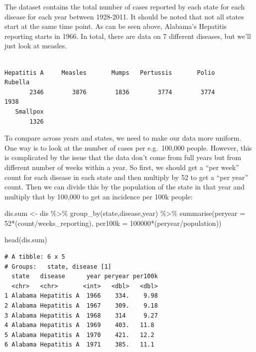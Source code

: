 \documentclass[
  letterpaper,
  DIV=11,
  numbers=noendperiod]{scrreprt}
\newenvironment{Shaded}{\begin{snugshade}}{\end{snugshade}}
\newcommand{\AttributeTok}[1]{\textcolor[rgb]{0.40,0.45,0.13}{#1}}
\newcommand{\DecValTok}[1]{\textcolor[rgb]{0.68,0.00,0.00}{#1}}
\newcommand{\FunctionTok}[1]{\textcolor[rgb]{0.28,0.35,0.67}{#1}}
\newcommand{\NormalTok}[1]{\textcolor[rgb]{0.00,0.23,0.31}{#1}}
\newcommand{\OtherTok}[1]{\textcolor[rgb]{0.00,0.23,0.31}{#1}}
\newcommand{\SpecialCharTok}[1]{\textcolor[rgb]{0.37,0.37,0.37}{#1}}
\begin{document}
The dataset contains the total number of cases reported by each state
for each disease for each year between 1928-2011. It should be noted
that not all states start at the same time point. As can be seen above,
Alabama's Hepatitis reporting starts in 1966. In total, there are data
on 7 different diseases, but we'll just look at measles.

\begin{Shaded}
\end{Shaded}

\begin{verbatim}

Hepatitis A     Measles       Mumps   Pertussis       Polio     Rubella 
       2346        3876        1836        3774        3774        1938 
   Smallpox 
       1326 
\end{verbatim}

To compare across years and states, we need to make our data more
uniform. One way is to look at the number of cases per e.g.~100,000
people. However, this is complicated by the issue that the data don't
come from full years but from different number of weeks within a year.
So first, we should get a ``per week'' count for each disease in each
state and then multiply by 52 to get a ``per year'' count. Then we can
divide this by the population of the state in that year and multiply
that by 100,000 to get an incidence per 100k people:

\begin{Shaded}
\begin{Highlighting}[]
\NormalTok{dis.sum }\OtherTok{\textless{}{-}}\NormalTok{ dis }\SpecialCharTok{\%\textgreater{}\%}
  \FunctionTok{group\_by}\NormalTok{(state,disease,year) }\SpecialCharTok{\%\textgreater{}\%}
  \FunctionTok{summarise}\NormalTok{(}\AttributeTok{peryear =} \DecValTok{52}\SpecialCharTok{*}\NormalTok{(count}\SpecialCharTok{/}\NormalTok{weeks\_reporting),}
            \AttributeTok{per100k =} \DecValTok{100000}\SpecialCharTok{*}\NormalTok{(peryear}\SpecialCharTok{/}\NormalTok{population))}

\FunctionTok{head}\NormalTok{(dis.sum)}
\end{Highlighting}
\end{Shaded}

\begin{verbatim}
# A tibble: 6 x 5
# Groups:   state, disease [1]
  state   disease      year peryear per100k
  <chr>   <chr>       <int>   <dbl>   <dbl>
1 Alabama Hepatitis A  1966    334.    9.98
2 Alabama Hepatitis A  1967    309.    9.18
3 Alabama Hepatitis A  1968    314     9.27
4 Alabama Hepatitis A  1969    403.   11.8 
5 Alabama Hepatitis A  1970    421.   12.2 
6 Alabama Hepatitis A  1971    385.   11.1 
\end{verbatim}
\end{document}
